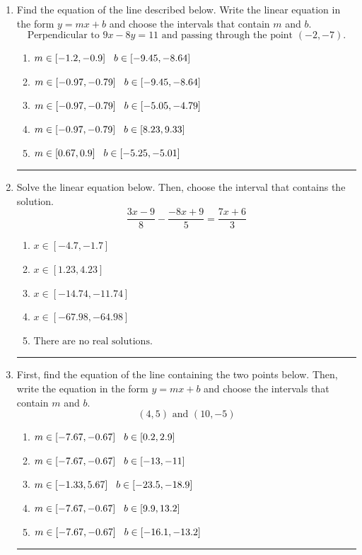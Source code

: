 \documentclass[14pt]{extbook}
\newcommand{\litem}[1]{\item#1\hspace*{-1cm}\rule{\textwidth}{0.4pt}}
\begin{document}
\begin{enumerate}
{\begin{enumerate}[label=\Alph*.]
\end{enumerate} }
\litem{
Find the equation of the line described below. Write the linear equation in the form $ y=mx+b $ and choose the intervals that contain $m$ and $b$.\[ \text{Perpendicular to } 9 x - 8 y = 11 \text{ and passing through the point } (-2, -7). \]\begin{enumerate}[label=\Alph*.]
\item \( m \in [-1.2, -0.9] \hspace*{3mm} b \in [-9.45, -8.64] \)
\item \( m \in [-0.97, -0.79] \hspace*{3mm} b \in [-9.45, -8.64] \)
\item \( m \in [-0.97, -0.79] \hspace*{3mm} b \in [-5.05, -4.79] \)
\item \( m \in [-0.97, -0.79] \hspace*{3mm} b \in [8.23, 9.33] \)
\item \( m \in [0.67, 0.9] \hspace*{3mm} b \in [-5.25, -5.01] \)

\end{enumerate} }
\litem{
Solve the linear equation below. Then, choose the interval that contains the solution.\[ \frac{3x -9}{8} - \frac{-8x + 9}{5} = \frac{7x + 6}{3} \]\begin{enumerate}[label=\Alph*.]
\item \( x \in [-4.7, -1.7] \)
\item \( x \in [1.23, 4.23] \)
\item \( x \in [-14.74, -11.74] \)
\item \( x \in [-67.98, -64.98] \)
\item \( \text{There are no real solutions.} \)

\end{enumerate} }
\litem{
First, find the equation of the line containing the two points below. Then, write the equation in the form $ y=mx+b $ and choose the intervals that contain $m$ and $b$.\[ (4, 5) \text{ and } (10, -5) \]\begin{enumerate}[label=\Alph*.]
\item \( m \in [-7.67, -0.67] \hspace*{3mm} b \in [0.2, 2.9] \)
\item \( m \in [-7.67, -0.67] \hspace*{3mm} b \in [-13, -11] \)
\item \( m \in [-1.33, 5.67] \hspace*{3mm} b \in [-23.5, -18.9] \)
\item \( m \in [-7.67, -0.67] \hspace*{3mm} b \in [9.9, 13.2] \)
\item \( m \in [-7.67, -0.67] \hspace*{3mm} b \in [-16.1, -13.2] \)


\end{enumerate}}
\end{enumerate}
\end{document}
